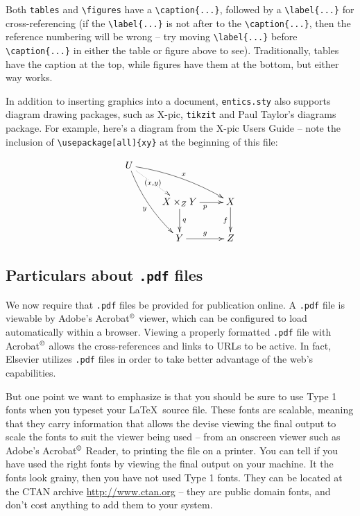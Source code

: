 \documentclass[twoside,11pt]{entics}
\begin{document}
Both \verb+tables+ and \verb+\figures+ have a \verb+\caption{...}+, followed by
a \verb+\label{...}+ for cross-referencing (if the \verb+\label{...}+ is not
after to the \verb+\caption{...}+, then the reference numbering will be wrong
-- try moving \verb+\label{...}+ before \verb+\caption{...}+ in either the
table or figure above to see). Traditionally, tables have the caption at the
top, while figures have them at the bottom, but either way works.

In addition to inserting graphics into a document, \verb+entics.sty+ also
supports diagram drawing packages, such as X\raisebox{-2pt}{Y}-pic,
\texttt{tikzit} and Paul Taylor's diagrams package. For example, here's a
diagram from the X\raisebox{-2pt}{Y}-pic Users Guide -- note the inclusion of
\verb+\usepackage[all]{xy}+ at the beginning of this file:

$$\xymatrix{
  U \ar@/_/[ddr]_y \ar@/^/[drr]^x
  \ar@{.>}[dr]|-{(x,y)}			\\
  & X \times_Z Y \ar[d]^q \ar[r]_p
  & X \ar[d]_f \\
  & Y \ar[r]^g & Z }$$

\subsection{Particulars about {\normalshape \texttt{.pdf} files}} We now require that \texttt{.pdf} files be provided for publication
online. A \texttt{.pdf} file is viewable by Adobe's Acrobat$^{\tiny
      \copyright}$ viewer, which can be configured to load automatically within a
browser. Viewing a properly formatted \texttt{.pdf} file with Acrobat$^{\tiny
      \copyright}$ allows the cross-references and links to URLs to be active. In
fact, Elsevier utilizes \texttt{.pdf} files in order to take better advantage
of the web's capabilities.

But one point we want to emphasize is that you should be sure to use Type 1
fonts when you typeset your \LaTeX\ source file. These fonts are scalable,
meaning that they carry information that allows the devise viewing the final
output to scale the fonts to suit the viewer being used -- from an onscreen
viewer such as Adobe's Acrobat$^{\tiny \copyright}$ Reader, to printing the
file on a printer. You can tell if you have used the right fonts by viewing the
final output on your machine. It the fonts look grainy, then you have not used
Type 1 fonts. They can be located at the CTAN archive \url{http://www.ctan.org}
-- they are public domain fonts, and don't cost anything to add them to your
system.
\end{document}
